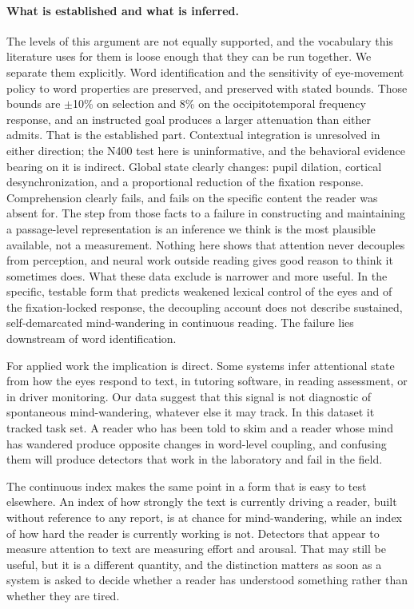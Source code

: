 \documentclass[11pt]{article}
\begin{document}
\paragraph{What is established and what is inferred.} The levels of this argument are not
equally supported, and the vocabulary this literature uses for them is loose enough that they
can be run together. We separate them explicitly. Word identification and the sensitivity of eye-movement policy to word properties are preserved,
and preserved with stated bounds. Those bounds are $\pm$10\% on selection and 8\% on the
occipitotemporal frequency response, and an instructed goal produces a larger attenuation than
either admits. That is the established part.
Contextual integration is unresolved in either direction; the N400 test here is uninformative,
and the behavioral evidence bearing on it is indirect. Global state clearly changes: pupil
dilation, cortical desynchronization, and a proportional reduction of the fixation response.
Comprehension clearly fails, and fails on the specific content the reader was absent for. The
step from those facts to a failure in constructing and maintaining a passage-level
representation is an inference we think is the most plausible available, not a measurement.
Nothing here shows that attention never decouples from perception, and neural work outside
reading gives good reason to think it sometimes does. What these data exclude is narrower and more useful. In the specific, testable form that predicts
weakened lexical control of the eyes and of the fixation-locked response, the decoupling account
does not describe sustained, self-demarcated mind-wandering in continuous reading. The failure lies downstream of word
identification.

For applied work the implication is direct. Some systems infer attentional state from how the eyes respond to text, in tutoring software, in
reading assessment, or in driver monitoring. Our data suggest that this signal is not diagnostic
of spontaneous mind-wandering, whatever else it may track. In this dataset it tracked task set. A reader who has been told to skim and a
reader whose mind has wandered produce opposite changes in word-level coupling, and confusing
them will produce detectors that work in the laboratory and fail in the field.

The continuous index makes the same point in a form that is easy to test elsewhere. An index of
how strongly the text is currently driving a reader, built without reference to any report, is
at chance for mind-wandering, while an index of how hard the reader is currently working is not.
Detectors that appear to measure attention to text are measuring effort and arousal. That may
still be useful, but it is a different quantity, and the distinction matters as soon as a system
is asked to decide whether a reader has understood something rather than whether they are
tired.
\end{document}
